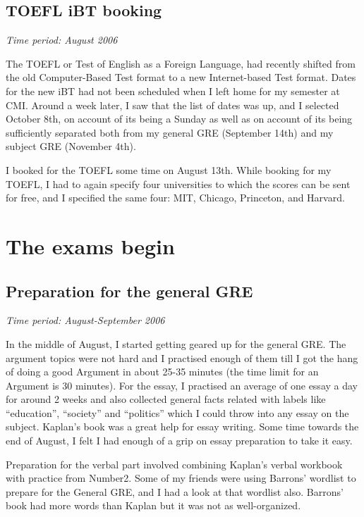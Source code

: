 \documentclass[a4paper]{amsart}
\begin{document}
\subsection{TOEFL iBT booking}

{\em Time period: August 2006}

The TOEFL or Test of English as a Foreign Language, had recently shifted
from the old Computer-Based Test format to a new Internet-based Test
format. Dates for the new iBT had not been scheduled when I left home
for my semester at CMI. Around a week later, I saw that the list of dates
was up, and I selected October 8th, on account of its being a Sunday
as well as on account of its being sufficiently separated both from
my general GRE (September 14th) and my subject GRE (November 4th).

I booked for the TOEFL some time on August 13th. While booking for my
TOEFL, I had to again specify four universities to which the scores
can be sent for free, and I specified the same four: MIT, Chicago,
Princeton, and Harvard.

\section{The exams begin}

\subsection{Preparation for the general GRE}

{\em Time period: August-September 2006}

In the middle of August, I started getting geared up for the general
GRE.  The argument topics were not hard and I practised enough of them
till I got the hang of doing a good Argument in about 25-35 minutes
(the time limit for an Argument is 30 minutes). For the essay, I
practised an average of one essay a day for around 2 weeks and also
collected general facts related with labels like ``education'',
``society'' and ``politics'' which I could throw into any essay on the
subject. Kaplan's book was a great help for essay writing. Some time towards
the end of August, I felt I had enough of a grip on essay preparation
to take it easy.

Preparation for the verbal part involved combining Kaplan's verbal workbook
with practice from Number2. Some of my friends were using Barrons'
wordlist to prepare for the General GRE, and I had a look at that wordlist
also. Barrons' book had more words than Kaplan but it was not as 
well-organized.
\end{document}
